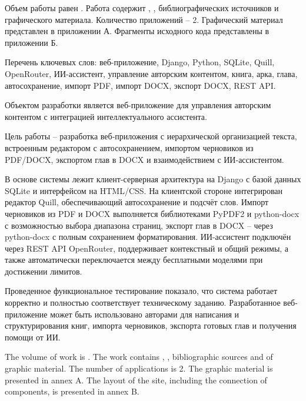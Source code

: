 
Объем работы равен . Работа содержит , ,  библиографических источников и  графического материала. Количество приложений – 2. Графический материал представлен в приложении А. Фрагменты исходного кода представлены в приложении Б.

Перечень ключевых слов: веб-приложение, Django, Python, SQLite, Quill, OpenRouter, ИИ-ассистент, управление авторским контентом, книга, арка, глава, автосохранение, импорт PDF, импорт DOCX, экспорт DOCX, REST API.

Объектом разработки является веб-приложение для управления авторским контентом с интеграцией интеллектуального ассистента.

Цель работы -- разработка веб-приложения с иерархической организацией текста, встроенным редактором с автосохранением, импортом черновиков из PDF/DOCX, экспортом глав в DOCX и взаимодействием с ИИ-ассистентом.

В основе системы лежит клиент-серверная архитектура на Django с базой данных SQLite и интерфейсом на HTML/CSS. На клиентской стороне интегрирован редактор Quill, обеспечивающий автосохранение и подсчёт слов. Импорт черновиков из PDF и DOCX выполняется библиотеками PyPDF2 и python-docx с возможностью выбора диапазона страниц, экспорт глав в DOCX -- через python-docx с полным сохранением форматирования. ИИ-ассистент подключён через REST API OpenRouter, поддерживает контекстный и общий режимы, а также автоматически переключается между бесплатными моделями при достижении лимитов.

Проведенное функциональное тестирование показало, что система работает корректно и полностью соответствует техническому заданию. Разработанное веб-приложение может быть использовано авторами для написания и структурирования книг, импорта черновиков, экспорта готовых глав и получения помощи от ИИ.


  
The volume of work is . The work contains , ,  bibliographic sources and  of graphic material. The number of applications is 2. The graphic material is presented in annex A. The layout of the site, including the connection of components, is presented in annex B.

